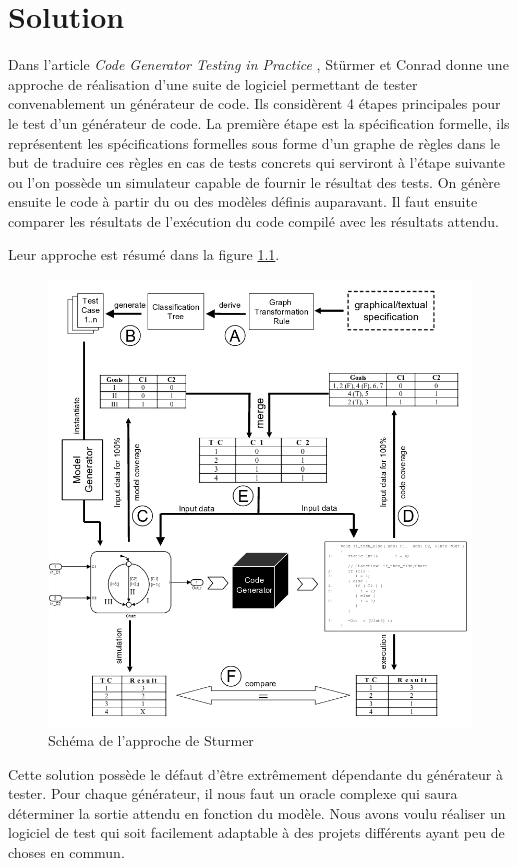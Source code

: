 \chapter{Solution}


Dans l'article \textit{Code Generator Testing in Practice} \cite{sturmer2004}, Stürmer et Conrad donne une approche de réalisation
d'une suite de logiciel permettant de tester convenablement un générateur de code.
Ils considèrent 4 étapes principales pour le test d'un générateur de code. La première étape est la spécification formelle, ils représentent les spécifications
formelles sous forme d'un graphe de règles dans le but de traduire ces règles en cas de tests concrets qui serviront à l'étape suivante ou l'on possède
un simulateur capable de fournir le résultat des tests. On génère ensuite le code à partir du ou des modèles définis auparavant. Il faut ensuite
comparer les résultats de l’exécution du code compilé avec les résultats attendu.

Leur approche est résumé dans la figure \ref{codegen}.


\begin{figure}[!ht]
	\centering
	\includegraphics[width=0.7\linewidth]{images/codegen.png}
	\caption{Schéma de l'approche de Sturmer}
	\label{codegen}
\end{figure}


Cette solution possède le défaut d'être extrêmement dépendante du générateur à tester. Pour chaque générateur, il nous faut un oracle complexe
qui saura déterminer la sortie attendu en fonction du modèle. Nous avons voulu réaliser un logiciel de test qui soit facilement adaptable à des
projets différents ayant peu de choses en commun.

